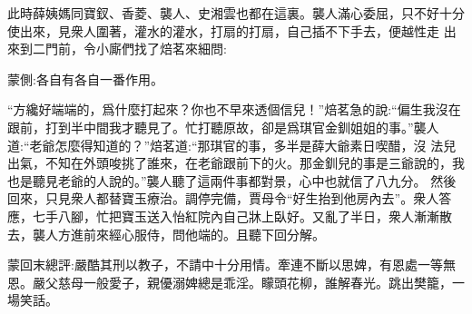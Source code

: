 \begin{parag}
    此時薛姨媽同寶釵、香菱、襲人、史湘雲也都在這裏。襲人滿心委屈，只不好十分使出來，見衆人圍著，灌水的灌水，打扇的打扇，自己插不下手去，便越性走 出來到二門前，令小廝們找了焙茗來細問:\begin{note}蒙側:各自有各自一番作用。\end{note}“方纔好端端的，爲什麼打起來？你也不早來透個信兒！”焙茗急的說:“偏生我沒在跟前，打到半中間我才聽見了。忙打聽原故，卻是爲琪官金釧姐姐的事。”襲人道:“老爺怎麼得知道的？”焙茗道:“那琪官的事，多半是薛大爺素日喫醋，沒 法兒出氣，不知在外頭唆挑了誰來，在老爺跟前下的火。那金釧兒的事是三爺說的，我也是聽見老爺的人說的。”襲人聽了這兩件事都對景，心中也就信了八九分。 然後回來，只見衆人都替寶玉療治。調停完備，賈母令“好生抬到他房內去”。衆人答應，七手八腳，忙把寶玉送入怡紅院內自己牀上臥好。又亂了半日，衆人漸漸散去，襲人方進前來經心服侍，問他端的。且聽下回分解。
\end{parag}


\begin{parag}
    \begin{note}蒙回末總評:嚴酷其刑以教子，不請中十分用情。牽連不斷以思婢，有恩處一等無恩。嚴父慈母一般愛子，親優溺婢總是乖淫。矇頭花柳，誰解春光。跳出樊籠，一場笑話。\end{note}
\end{parag}


